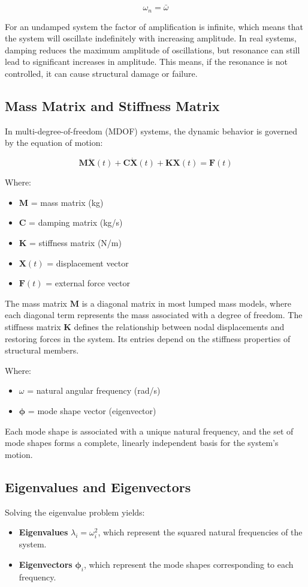 \documentclass{article}  %
\begin{document}
$$\omega_n = \bar{\omega}$$

For an undamped system the factor of amplification is infinite, which means that the system will oscillate indefinitely with increasing amplitude. In real systems, damping reduces the maximum amplitude of oscillations, but resonance can still lead to significant increases in amplitude. This means, if the resonance is not controlled, it can cause structural damage or failure. 
\subsection{Mass Matrix and Stiffness Matrix}
In multi-degree-of-freedom (MDOF) systems, the dynamic behavior is governed by the equation of motion:

\begin{equation}
\mathbf{M} \ddot{\mathbf{X}}(t) + \mathbf{C} \dot{\mathbf{X}}(t) + \mathbf{K} \mathbf{X}(t) = \mathbf{F}(t)
\end{equation}

Where:
\begin{itemize}
  \item $\mathbf{M}$ = mass matrix (kg)
  \item $\mathbf{C}$ = damping matrix (kg/s)
  \item $\mathbf{K}$ = stiffness matrix (N/m)
  \item $\mathbf{X}(t)$ = displacement vector
  \item $\mathbf{F}(t)$ = external force vector
\end{itemize}

The mass matrix $\mathbf{M}$ is a diagonal matrix in most lumped mass models, where each diagonal term represents the mass associated with a degree of freedom. The stiffness matrix $\mathbf{K}$ defines the relationship between nodal displacements and restoring forces in the system. Its entries depend on the stiffness properties of structural members.


Where:
\begin{itemize}
  \item $\omega$ = natural angular frequency (rad/s)
  \item $\boldsymbol{\phi}$ = mode shape vector (eigenvector)
\end{itemize}

Each mode shape is associated with a unique natural frequency, and the set of mode shapes forms a complete, linearly independent basis for the system’s motion.

\subsection{Eigenvalues and Eigenvectors}
Solving the eigenvalue problem yields:
\begin{itemize}
  \item \textbf{Eigenvalues} $\lambda_i = \omega_i^2$, which represent the squared natural frequencies of the system.
  \item \textbf{Eigenvectors} $\boldsymbol{\phi}_i$, which represent the mode shapes corresponding to each frequency.
\end{itemize}
\end{document}
